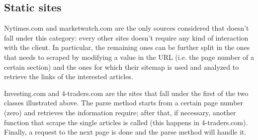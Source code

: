 \subsection{Static sites}
Nytimes.com and marketwatch.com are the only sources considered that doesn't fall under this category: every other sites doesn't require any kind of interaction with the client. In particular, the remaining ones can be further split in the ones that needs to scraped by modifying a value in the URL (i.e. the page number of a certain section) and the ones for which their sitemap is used and analyzed to retrieve the links of the interested articles. 
\par
Investing.com and 4-traders.com are the sites that fall under the first of the two classes illustrated above. The parse method starts from a certain page number (zero) and retrieves the information require; after that, if necessary, another function that scrape the single articles is called (this happens in 4-traders.com). Finally, a request to the next page is done and the parse method will handle it.
\par 